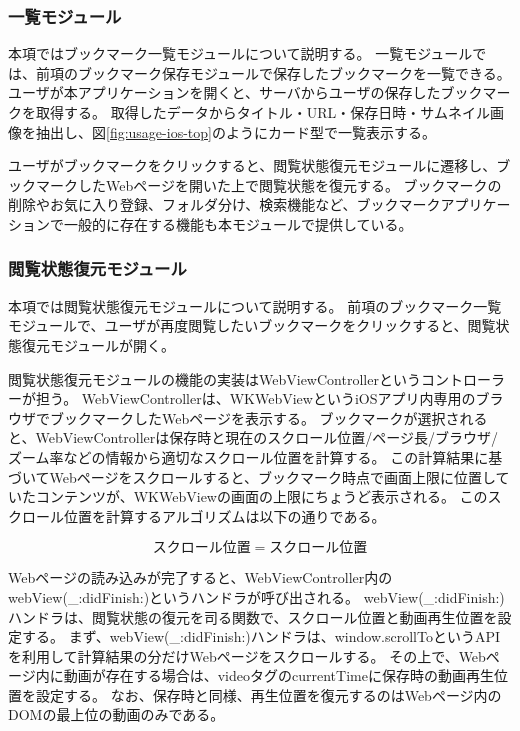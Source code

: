 \subsubsection{一覧モジュール}
本項ではブックマーク一覧モジュールについて説明する。
一覧モジュールでは、前項のブックマーク保存モジュールで保存したブックマークを一覧できる。
ユーザが本アプリケーションを開くと、サーバからユーザの保存したブックマークを取得する。
取得したデータからタイトル・URL・保存日時・サムネイル画像を抽出し、図\ref{fig:usage-ios-top}のようにカード型で一覧表示する。

ユーザがブックマークをクリックすると、閲覧状態復元モジュールに遷移し、ブックマークしたWebページを開いた上で閲覧状態を復元する。
ブックマークの削除やお気に入り登録、フォルダ分け、検索機能など、ブックマークアプリケーションで一般的に存在する機能も本モジュールで提供している。

\subsubsection{閲覧状態復元モジュール}
\label{sec:impl-client-ios-restore-module}

本項では閲覧状態復元モジュールについて説明する。
前項のブックマーク一覧モジュールで、ユーザが再度閲覧したいブックマークをクリックすると、閲覧状態復元モジュールが開く。

閲覧状態復元モジュールの機能の実装はWebViewControllerというコントローラーが担う。
WebViewControllerは、WKWebViewというiOSアプリ内専用のブラウザでブックマークしたWebページを表示する。
ブックマークが選択されると、WebViewControllerは保存時と現在のスクロール位置/ページ長/ブラウザ/ズーム率などの情報から適切なスクロール位置を計算する。
この計算結果に基づいてWebページをスクロールすると、ブックマーク時点で画面上限に位置していたコンテンツが、WKWebViewの画面の上限にちょうど表示される。
このスクロール位置を計算するアルゴリズムは以下の通りである。

\begin{equation}
スクロール位置 = スクロール位置
\end{equation}

Webページの読み込みが完了すると、WebViewController内のwebView(\_:didFinish:)\cite{did-finish}というハンドラが呼び出される。
webView(\_:didFinish:)ハンドラは、閲覧状態の復元を司る関数で、スクロール位置と動画再生位置を設定する。
まず、webView(\_:didFinish:)ハンドラは、window.scrollToというAPIを利用して計算結果の分だけWebページをスクロールする。
その上で、Webページ内に動画が存在する場合は、videoタグのcurrentTimeに保存時の動画再生位置を設定する。
なお、保存時と同様、再生位置を復元するのはWebページ内のDOMの最上位の動画のみである。

